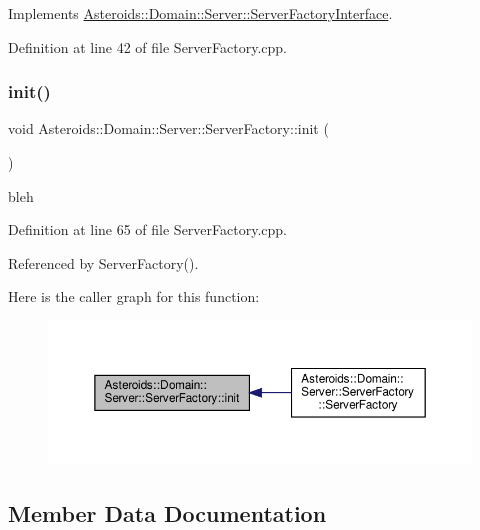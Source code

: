 Implements \hyperlink{classAsteroids_1_1Domain_1_1Server_1_1ServerFactoryInterface_a08286f1ac8f12fb63eeadeedad7d6d9b}{Asteroids\+::\+Domain\+::\+Server\+::\+Server\+Factory\+Interface}.



Definition at line 42 of file Server\+Factory.\+cpp.

\mbox{\label{classAsteroids_1_1Domain_1_1Server_1_1ServerFactory_aa493ea3acf57b43b9c646bc950d1cbea}} 
\subsubsection{\texorpdfstring{init()}{init()}}
{\footnotesize\ttfamily void Asteroids\+::\+Domain\+::\+Server\+::\+Server\+Factory\+::init (\begin{DoxyParamCaption}{ }\end{DoxyParamCaption})\hspace{0.3cm}{\ttfamily [private]}}

bleh 

Definition at line 65 of file Server\+Factory.\+cpp.



Referenced by Server\+Factory().

Here is the caller graph for this function\+:\nopagebreak
\begin{figure}[H]
\begin{center}
\leavevmode
\includegraphics[width=350pt]{classAsteroids_1_1Domain_1_1Server_1_1ServerFactory_aa493ea3acf57b43b9c646bc950d1cbea_icgraph}
\end{center}
\end{figure}


\subsection{Member Data Documentation}
\mbox{\label{classAsteroids_1_1Domain_1_1Server_1_1ServerFactory_ae3febd57c09d282d0b95300bb86b9f9a}} 
